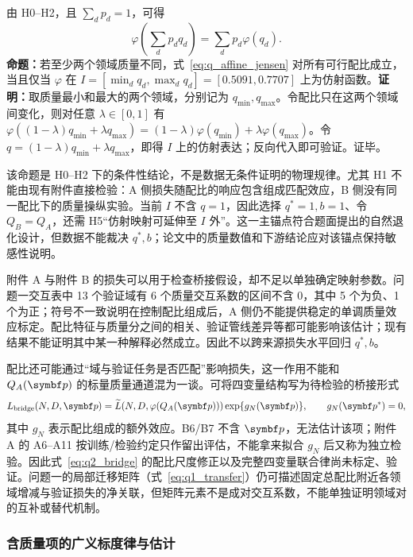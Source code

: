 由 H0--H2，且 $\sum_dp_d=1$，可得
\begin{equation}
\varphi\!\left(\sum_dp_dq_d\right)=\sum_dp_d\varphi(q_d).
\label{eq:q_affine_jensen}
\end{equation}
\textbf{命题：}若至少两个领域质量不同，式~\eqref{eq:q_affine_jensen} 对所有可行配比成立，当且仅当 $\varphi$ 在 $I=[\min_dq_d,\max_dq_d]=[0.5091,0.7707]$ 上为仿射函数。\textbf{证明：}取质量最小和最大的两个领域，分别记为 $q_{\min},q_{\max}$。令配比只在这两个领域间变化，则对任意 $\lambda\in[0,1]$ 有 $\varphi((1-\lambda)q_{\min}+\lambda q_{\max})=(1-\lambda)\varphi(q_{\min})+\lambda\varphi(q_{\max})$。令 $q=(1-\lambda)q_{\min}+\lambda q_{\max}$，即得 $I$ 上的仿射表达；反向代入即可验证。证毕。

该命题是 H0--H2 下的条件性结论，不是数据无条件证明的物理规律。尤其 H1 不能由现有附件直接检验：A 侧损失随配比的响应包含组成匹配效应，B 侧没有同一配比下的质量操纵实验。当前 $I$ 不含 $q=1$，因此选择 $q^*=1,b=1$、令 $Q_B=Q_A$，还需 H5“仿射映射可延伸至 $I$ 外”。这一主锚点符合题面提出的自然退化设计，但数据不能裁决 $q^*,b$；论文中的质量数值和下游结论应对该锚点保持敏感性说明。

附件 A 与附件 B 的损失可以用于检查桥接假设，却不足以单独确定映射参数。问题一交互表中 13 个验证域有 6 个质量交互系数的区间不含 0，其中 5 个为负、1 个为正；符号不一致说明在控制配比组成后，A 侧仍不能提供稳定的单调质量效应标定。配比特征与质量分之间的相关、验证管线差异等都可能影响该估计；现有结果不能证明其中某一种解释必然成立。因此不以跨来源损失水平回归 $q^*,b$。

配比还可能通过“域与验证任务是否匹配”影响损失，这一作用不能和 $Q_A(\bp)$ 的标量质量通道混为一谈。可将四变量结构写为待检验的桥接形式
\begin{equation}
L_{\mathrm{bridge}}(N,D,\bp)=\widetilde L\!\left(N,D,\varphi(Q_A(\bp))\right)\exp\{g_N(\bp)\},\qquad g_N(\bp^*)=0,
\label{eq:q2_bridge}
\end{equation}
其中 $g_N$ 表示配比组成的额外效应。B6/B7 不含 $\bp$，无法估计该项；附件 A 的 A6--A11 按训练/检验约定只作留出评估，不能拿来拟合 $g_N$ 后又称为独立检验。因此式~\eqref{eq:q2_bridge} 的配比尺度修正以及完整四变量联合律尚未标定、验证。问题一的局部迁移矩阵（式~\eqref{eq:q1_transfer}）仍可描述固定总配比附近各领域增减与验证损失的净关联，但矩阵元素不是成对交互系数，不能单独证明领域对的互补或替代机制。

\subsubsection{含质量项的广义标度律与估计}

